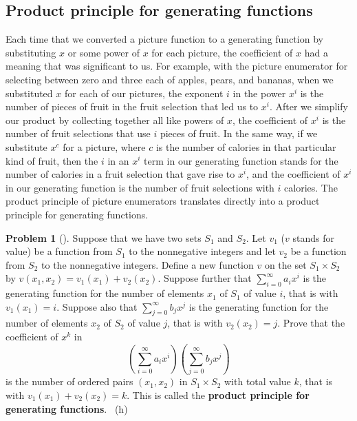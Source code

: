 \documentclass[10pt,]{book}
\newcommand{\terminology}[1]{\textbf{#1}}
\theoremstyle{plain}
\theoremstyle{definition}
\newtheorem{activity}[project]{Problem}
\theoremstyle{definition}
\numberwithin{equation}{chapter}
\begin{document}
\subsection[{Product principle for generating functions}]{Product principle for generating functions}\label{subsection-44}
\hypertarget{p-1090}{}%
Each time that we converted a picture function to a generating function by substituting \(x\) or some power of \(x\) for each picture, the coefficient of \(x\) had a meaning that was significant to us. For example, with the picture enumerator for selecting between zero and three each of apples, pears, and bananas, when we substituted \(x\) for each of our pictures, the exponent \(i\) in the power \(x^i\) is the number of pieces of fruit in the fruit selection that led us to \(x^i\). After we simplify our product by collecting together all like powers of \(x\), the coefficient of \(x^i\) is the number of fruit selections that use \(i\) pieces of fruit. In the same way, if we substitute \(x^c\) for a picture, where \(c\) is the number of calories in that particular kind of fruit, then the \(i\) in an \(x^i\) term in our generating function stands for the number of calories in a fruit selection that gave rise to \(x^i\), and the coefficient of \(x^i\) in our generating function is the number of fruit selections with \(i\) calories.  The product principle of picture enumerators translates directly into a product principle for generating functions.%
\begin{activity}[] \label{ProductPrincipleOGF}
\hypertarget{p-1091}{}%
Suppose that we have two sets \(S_1\) and \(S_2\). Let \(v_1\) (\(v\) stands for value) be a function from \(S_1\) to the nonnegative integers and let \(v_2\) be a function from \(S_2\) to the nonnegative integers.  Define a new function \(v\) on the set \(S_1 \times S_2\) by \(v(x_1,x_2) = v_1(x_1) +v_2(x_2)\). Suppose further that \(\sum_{i=0}^\infty a_ix^i\) is the generating function for the number of elements \(x_1\) of \(S_1\) of value \(i\), that is with \(v_1(x_1)=i\). Suppose also that \(\sum_{j=0}^\infty b_j x^j\) is the generating function for the number of elements \(x_2\) of \(S_2\) of value \(j\), that is with \(v_2(x_2) = j\).  Prove that the coefficient of \(x^k\) in%
\begin{equation*}
\left(\sum_{i=0}^\infty a_ix^i\right)\left(\sum_{j=0}^\infty
b_jx^j\right)
\end{equation*}
is the number of ordered pairs \((x_1,x_2)\) in \(S_1\times S_2\) with total value \(k\), that is with \(v_1(x_1) +v_2(x_2) =k\). This is called the \terminology{product principle for generating functions}.%
~{\tiny (h)}\end{activity}
\end{document}
